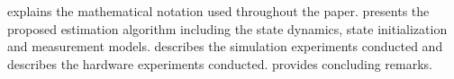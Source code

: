 
 explains the mathematical notation used throughout the paper.
 presents the proposed estimation algorithm including the
state dynamics, state initialization and measurement models.
 describes the simulation experiments conducted and
 describes the hardware experiments conducted.
 provides concluding remarks.
